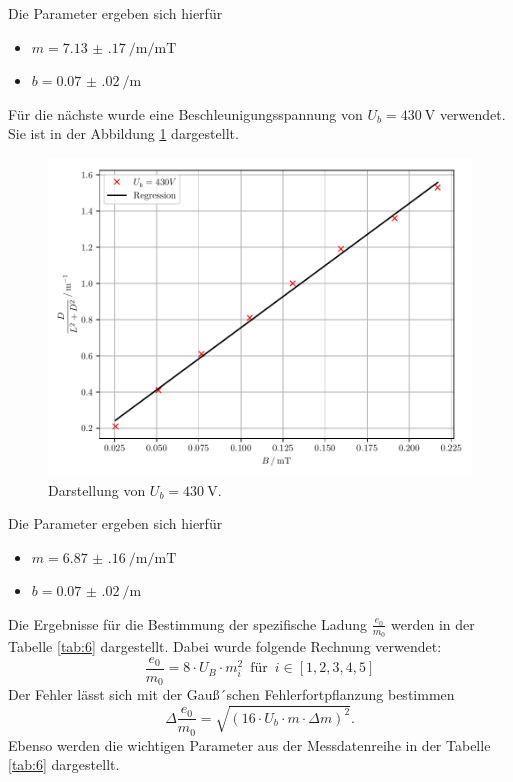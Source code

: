 Die Parameter ergeben sich hierfür
\begin{itemize}
  \item $m = \SI[per-mode=fraction]{7.13(17)}{\per\meter\per\milli\tesla}$
  \item $b =\SI[per-mode=fraction]{0.07(02)}{\per\meter}$
\end{itemize}
Für die nächste wurde eine Beschleunigungsspannung von $U_b = \SI{430}{\volt}$ verwendet.
Sie ist in der Abbildung \ref{abb:16} dargestellt.
\begin{figure}[H]
  \centering
  \includegraphics{plot11.pdf}
  \caption{Darstellung von $U_b=\SI{430}{\volt}$.}
  \label{abb:16}
\end{figure}
Die Parameter ergeben sich hierfür
\begin{itemize}
  \item $m = \SI[per-mode=fraction]{6.87(16)}{\per\meter\per\milli\tesla}$
  \item $b =\SI[per-mode=fraction]{0.07(02)}{\per\meter}$
\end{itemize}

Die Ergebnisse für die Bestimmung der spezifische Ladung $\frac{e_0}{m_0}$ werden
in der Tabelle \ref{tab:6} dargestellt. Dabei wurde folgende Rechnung verwendet:
\begin{equation*}
  \frac{e_0}{m_0} = 8 \cdot U_B \cdot m_{i}^2 \,\,\, \text{für} \,\,\, i \in [1,2,3,4,5]
\end{equation*}
Der Fehler lässt sich mit der Gauß´schen Fehlerfortpflanzung bestimmen
\begin{equation*}
  \Delta \frac{e_0}{m_0} = \sqrt{(16 \cdot U_b \cdot m \cdot \Delta m)^2}.
\end{equation*}
Ebenso werden die wichtigen Parameter aus der Messdatenreihe in der Tabelle \ref{tab:6}
dargestellt.

